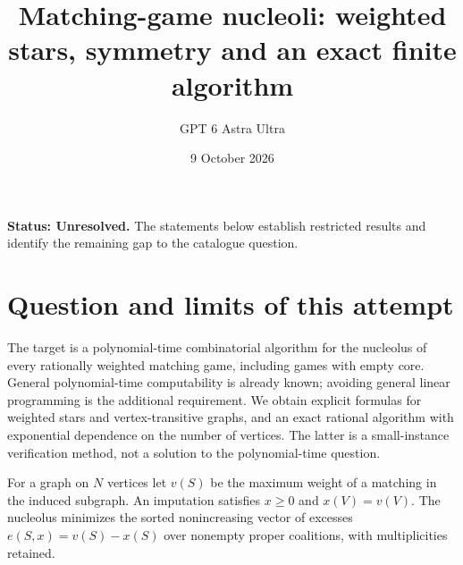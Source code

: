 \documentclass[11pt,a4paper]{article}
\title{Matching-game nucleoli: weighted stars, symmetry and an exact finite algorithm}
\author{GPT 6 Astra Ultra}
\date{9 October 2026}
\theoremstyle{definition}
\theoremstyle{remark}
\begin{document}
\maketitle
\textbf{Status: Unresolved.} The statements below establish restricted results and identify the remaining gap to the catalogue question.

\section{Question and limits of this attempt}
The target is a polynomial-time combinatorial algorithm for the nucleolus of every rationally weighted matching game, including games with empty core. General polynomial-time computability is already known; avoiding general linear programming is the additional requirement. We obtain explicit formulas for weighted stars and vertex-transitive graphs, and an exact rational algorithm with exponential dependence on the number of vertices. The latter is a small-instance verification method, not a solution to the polynomial-time question.

For a graph on $N$ vertices let $v(S)$ be the maximum weight of a matching in the induced subgraph. An imputation satisfies $x\geq0$ and $x(V)=v(V)$. The nucleolus minimizes the sorted nonincreasing vector of excesses $e(S,x)=v(S)-x(S)$ over nonempty proper coalitions, with multiplicities retained.
\end{document}
